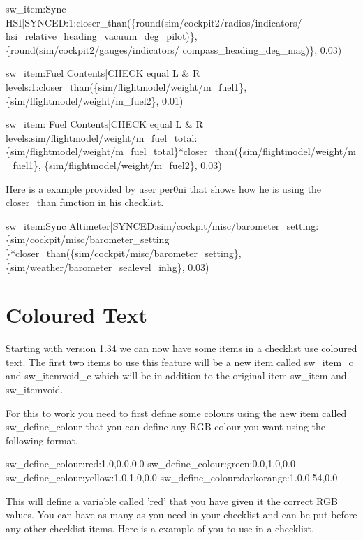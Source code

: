 \documentclass[11pt,parskip=half,a4paper]{scrartcl}
\begin{document}
sw\_item:Sync HSI|SYNCED:1:closer\_than(\{round(sim/cockpit2/radios/indicators/\newline
hsi\_relative\_heading\_vacuum\_deg\_pilot)\}, \{round(sim/cockpit2/gauges/indicators/\newline
compass\_heading\_deg\_mag)\}, 0.03)

sw\_item:Fuel Contents|CHECK equal L \& R levels:1:closer\_than(\{sim/flightmodel/weight/m\_fuel1\}, \{sim/flightmodel/weight/m\_fuel2\}, 0.01)

sw\_item: Fuel Contents|CHECK equal L \& R levels:sim/flightmodel/weight/m\_fuel\_total:\newline
\{sim/flightmodel/weight/m\_fuel\_total\}*closer\_than(\{sim/flightmodel/weight/m\_fuel1\}, 
\{sim/flightmodel/weight/m\_fuel2\}, 0.03)\newline


Here is a example provided by user per0ni that shows how he is using the closer\_than function in his checklist.

sw\_item:Sync Altimeter|SYNCED:sim/cockpit/misc/barometer\_setting:\{sim/cockpit/misc/barometer\_setting
\}*closer\_than(\{sim/cockpit/misc/barometer\_setting\}, \{sim/weather/barometer\_sealevel\_inhg\}, 0.03)


\newpage
\section{Coloured Text}

Starting with version 1.34 we can now have some items in a checklist use coloured text. The first two items to use this feature will be a new item called sw\_item\_c and sw\_itemvoid\_c which will be in addition to the original item sw\_item and sw\_itemvoid.

For this to work you need to first define some colours using the new item called sw\_define\_colour that you can define any RGB colour you want using the following format.

sw\_define\_colour:red:1.0,0.0,0.0 \newline
sw\_define\_colour:green:0.0,1.0,0.0 \newline
sw\_define\_colour:yellow:1.0,1.0,0.0 \newline
sw\_define\_colour:darkorange:1.0,0.54,0.0

This will define a variable called 'red' that you have given it the correct RGB values. You can have as many as you need in your checklist and can be put before any other checklist items. Here is a example of you to use in a checklist.
\end{document}
